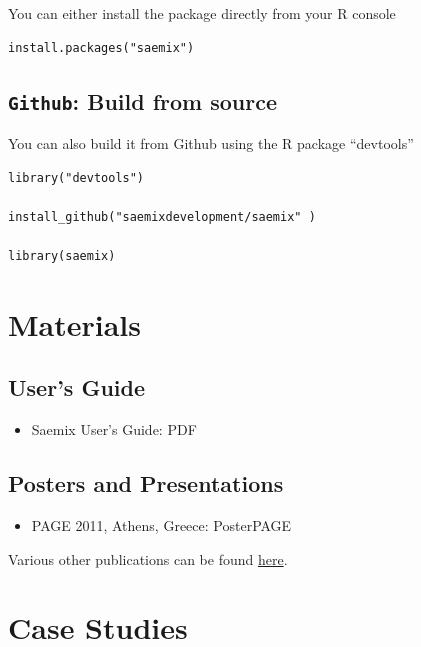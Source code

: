 \documentclass[]{book}
\providecommand{\tightlist}{%
  \setlength{\itemsep}{0pt}\setlength{\parskip}{0pt}}
\begin{document}
You can either install the package directly from your R console

\begin{verbatim}
install.packages("saemix")
\end{verbatim}

\section{\texorpdfstring{\texttt{Github}: Build from
source}{Github: Build from source}}\label{github-build-from-source}

You can also build it from Github using the R package ``devtools''

\begin{verbatim}
library("devtools")

install_github("saemixdevelopment/saemix" )

library(saemix)
\end{verbatim}

\chapter{Materials}\label{materials}

\section{User's Guide}\label{users-guide}

\begin{itemize}
\tightlist
\item
  Saemix User's Guide: PDF
\end{itemize}

\section{Posters and Presentations}\label{posters-and-presentations}

\begin{itemize}
\tightlist
\item
  PAGE 2011, Athens, Greece: PosterPAGE
\end{itemize}

Various other publications can be found
\href{https://github.com/saemixdevelopment/Publications}{here}.

\chapter{Case Studies}\label{casestudies}
\end{document}
